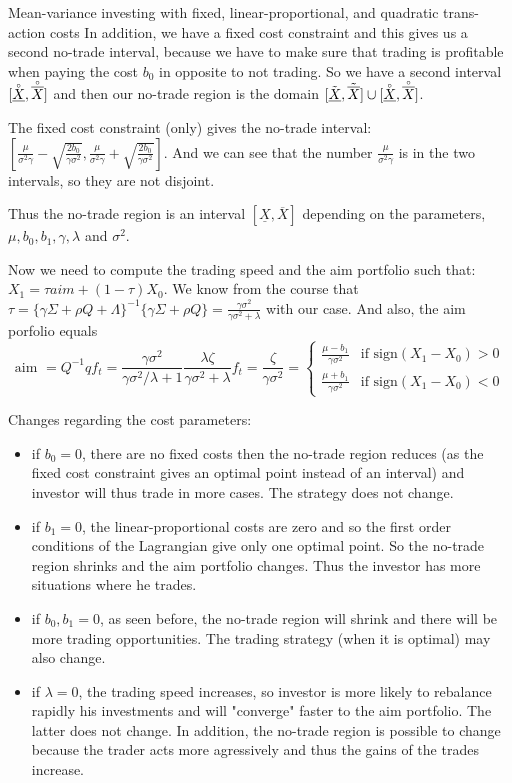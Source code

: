 \documentclass[10pt]{article}
\newenvironment{exercise}[2][Exercise]{\begin{trivlist}
  \item[\hskip \labelsep {\bfseries #1}\hskip \labelsep {\bfseries #2.}]}{\end{trivlist}}
\begin{document}
\begin{exercise}{1}{Mean-variance investing with fixed, linear-proportional, and quadratic trans- action costs}
  In addition, we have a fixed cost constraint and this gives us a second no-trade interval, because we have to make sure that trading is profitable when paying the cost $b_0$ in opposite to not trading. So we have a second interval $[\accentset{\circ}{\underline{X}},\accentset{\circ}{\overline{X}}]$ and then our no-trade region is the domain $ [\tilde{\underline{X}},\tilde{\overline{X}}]\cup [\accentset{\circ}{\underline{X}},\accentset{\circ}{\overline{X}}]$. 

  The fixed cost constraint (only) gives the no-trade interval: $[\frac{\mu}{\sigma^2\gamma} -\sqrt{\frac{2b_0}{\gamma\sigma^2}},\frac{\mu}{\sigma^2\gamma} +\sqrt{\frac{2b_0}{\gamma\sigma^2}}]$. And we can see that the number $\frac{\mu}{\sigma^2\gamma}$ is in the two intervals, so they are not disjoint. 
  
  Thus the no-trade region is an interval $[\underline{X},\overline{X}]$ depending on the parameters, $\mu, b_0, b_1,\gamma, \lambda$ and $\sigma^2$. 

  Now we need to compute the trading speed and the aim portfolio such that: $X_1 = \tau aim + (1-\tau)X_0$. We know from the course that $\tau = \{\gamma \Sigma + \rho Q + \Lambda \}^{-1}\{\gamma\Sigma + \rho Q\} = \frac{\gamma\sigma^2}{\gamma\sigma^2 + \lambda} $ with our case. And also, the aim porfolio equals $$\text{aim } = Q^{-1}qf_t = \frac{\gamma\sigma^2}{\gamma\sigma^2/\lambda + 1}\frac{\lambda \zeta}{\gamma\sigma^2 + \lambda}f_t = \frac{\zeta}{\gamma\sigma^2} = \begin{cases}
    \frac{\mu - b_1}{\gamma\sigma^2} & \text{if sign}(X_1-X_0) > 0 \\
    \frac{\mu + b_1}{\gamma\sigma^2} & \text{if sign}(X_1-X_0) < 0
  \end{cases}$$ 

Changes regarding the cost parameters:
\begin{itemize}
  \item if $b_0 = 0$, there are no fixed costs then the no-trade region reduces (as the fixed cost constraint gives an optimal point instead of an interval) and investor will thus trade in more cases. The strategy does not change. 
  \item if $b_1 = 0$, the linear-proportional costs are zero and so the first order conditions of the Lagrangian give only one optimal point. So the no-trade region shrinks and the aim portfolio changes. Thus the investor has more situations where he trades. 
  \item if $b_0, b_1 = 0$, as seen before, the no-trade region will shrink and there will be more trading opportunities. The trading strategy (when it is optimal) may also change.
  \item if $\lambda = 0$, the trading speed increases, so investor is more likely to rebalance rapidly his investments and will "converge" faster to the aim portfolio. The latter does not change. In addition, the no-trade region is possible to change because the trader acts more agressively and thus the gains of the trades increase.  
\end{itemize}
\end{exercise}
\end{document}
